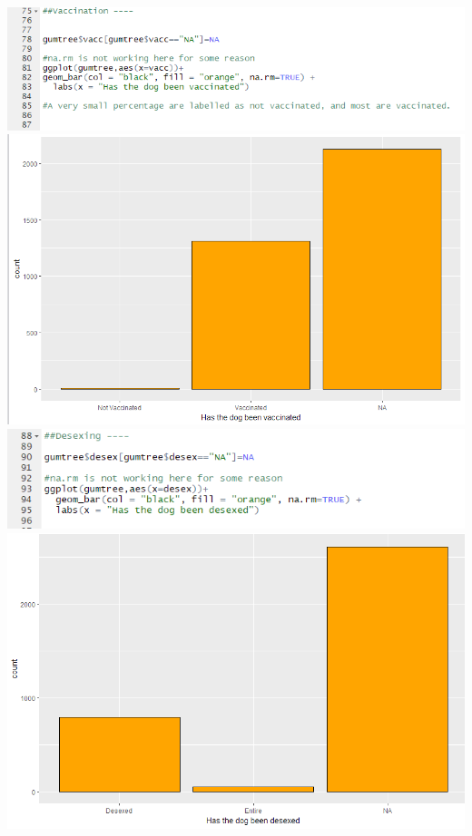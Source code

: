 \documentclass[a4paper]{article}
\begin{document}
{\includegraphics[scale=.75]{gumtree_VaccCode.PNG}\\
\includegraphics[scale=.75]{gumtree_VaccGraph.PNG}\\
\includegraphics[scale=.75]{gumtree_DesexCode.PNG}\\
\includegraphics[scale=.75]{gumtree_DesexGraph.PNG}\\
}
\end{document}

